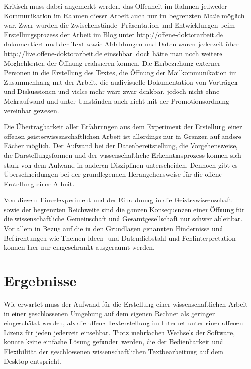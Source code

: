 Kritisch muss dabei angemerkt werden, das Offenheit im Rahmen jedweder Kommunikation im Rahmen dieser Arbeit auch nur im begrenzten Maße möglich war. Zwar wurden die Zwischenstände, Präsentation und Entwicklungen beim Erstellungsprozess der Arbeit im Blog unter http://offene-doktorarbeit.de dokumentiert und der Text sowie Abbildungen und Daten waren jederzeit über http://live.offene-doktorarbeit.de einsehbar, doch hätte man noch weitere Möglichkeiten der Öffnung realisieren können. Die Einbeziehung externer Personen in die Erstellung des Textes, die Öffnung der Mailkommunikation im Zusammenhang mit der Arbeit, die audivisuelle Dokumentation von Vorträgen und Diskussionen und vieles mehr wäre zwar denkbar, jedoch nicht ohne Mehraufwand und unter Umständen auch nicht mit der Promotionsordnung vereinbar gewesen.

Die Übertragbarkeit aller Erfahrungen aus dem Experiment der Erstellung einer offenen geisteswissenschaftlichen Arbeit ist allerdings nur in Grenzen auf andere Fächer möglich. Der Aufwand bei der Datenbereitstellung, die Vorgehensweise, die Darstellungsformen und der wissenschaftliche Erkenntnisprozess können sich stark von dem Aufwand in anderen Disziplinen unterscheiden. Dennoch gibt es Überschneidungen bei der grundlegenden Herangehensweise für die offene Erstellung einer Arbeit.

Von diesem Einzelexperiment und der Einordnung in die Geisteswissenschaft sowie der begrenzten Reichweite sind die ganzen Konsequenzen einer Öffnung für die wissenschaftliche Gemeinschaft und Gesamtgesellschaft nur schwer ableitbar. Vor allem in Bezug auf die in den Grundlagen genannten Hindernisse und Befürchtungen wie Themen Ideen- und Datendiebstahl und Fehlinterpretation können hier nur eingeschränkt ausgeräumt werden. 

\section{Ergebnisse}

Wie erwartet muss der Aufwand für die Erstellung einer wissenschaftlichen Arbeit in einer geschlossenen Umgebung auf dem eigenen Rechner als geringer eingeschätzt werden, als die offene Texterstellung im Internet unter einer offenen Lizenz für jeden jederzeit einsehbar. Trotz mehrfachen Wechsels der Software, konnte keine einfache Lösung gefunden werden, die der Bedienbarkeit und Flexibilität der geschlossenen wissenschaftlichen Textbearbeitung auf dem Desktop entspricht.

